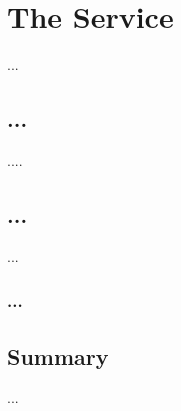 \chapter{The Service}
\label{ch:lit_rev}

...
\section{...}
....


\section{...}
...


\subsection{...}


\section{Summary}
...


